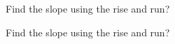 \documentclass[12pt, a4paper, addpoints]{exam}
\begin{document}
\begin{questions}



\newcommand{\smallspace}{\vspace{1mm}}


\question Find the slope using the rise and run?
\begin{multicols}{3}
\end{multicols}




\renewcommand{\smallspace}{\vspace{4mm}}
\question Find the slope using the rise and run?
\begin{multicols}{3}
\end{multicols}


\renewcommand{\smallspace}{\vspace{4mm}}







\end{questions}
\end{document}
